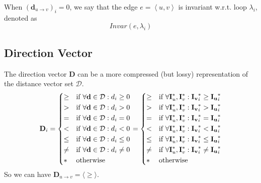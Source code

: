 When $\left(\mathbf{d}_{u \rightarrow v}\right)_{i} = 0$, we say that the edge
$e = \left\langle u, v \right\rangle$ is invariant w.r.t. loop $\lambda_{i}$,
denoted as
\[
  Invar(e, \lambda_{i})
\]

\subsection{Direction Vector}
The direction vector $\mathbf{D}$ can be a more compressed (but lossy) representation of the
distance vector set $\mathcal{D}$.
\begin{equation}
  \label{eq:ck94-direction-vector}
\mathbf{D}_{i}=
\begin{dcases}
  \ge & \text{if } \forall \mathbf{d} \in \mathcal{D}: d_{i} \ge 0 \\
  > & \text{if } \forall \mathbf{d} \in \mathcal{D}: d_{i} > 0 \\
  = & \text{if } \forall \mathbf{d} \in \mathcal{D}: d_{i} = 0 \\
  < & \text{if } \forall \mathbf{d} \in \mathcal{D}: d_{i} < 0 \\
  \le & \text{if } \forall \mathbf{d} \in \mathcal{D}: d_{i} \le 0 \\
  \neq & \text{if } \forall \mathbf{d} \in \mathcal{D}: d_{i} \neq 0 \\
  * & \text{otherwise}
\end{dcases}
=
\begin{dcases}
  \ge & \text{if } \forall \mathbf{I}_{u}^{*}, \mathbf{I}_{v}^{*}:
  \mathbf{I_{v}}^{*}_{i} \ge \mathbf{I_{u}}^{*}_{i} \\
  > & \text{if } \forall \mathbf{I}_{u}^{*}, \mathbf{I}_{v}^{*}:
  \mathbf{I_{v}}^{*}_{i} > \mathbf{I_{u}}^{*}_{i} \\
  = & \text{if } \forall \mathbf{I}_{u}^{*}, \mathbf{I}_{v}^{*}:
  \mathbf{I_{v}}^{*}_{i} = \mathbf{I_{u}}^{*}_{i} \\
  < & \text{if } \forall \mathbf{I}_{u}^{*}, \mathbf{I}_{v}^{*}:
  \mathbf{I_{v}}^{*}_{i} < \mathbf{I_{u}}^{*}_{i} \\
  \le & \text{if } \forall \mathbf{I}_{u}^{*}, \mathbf{I}_{v}^{*}:
  \mathbf{I_{v}}^{*}_{i} \le \mathbf{I_{u}}^{*}_{i} \\
  \neq & \text{if } \forall \mathbf{I}_{u}^{*}, \mathbf{I}_{v}^{*}:
  \mathbf{I_{v}}^{*}_{i} \neq \mathbf{I_{u}}^{*}_{i} \\
  * & \text{otherwise}
\end{dcases}
\end{equation}
So we can have $\mathbf{D}_{u \rightarrow v} = \langle \ge \rangle$.

